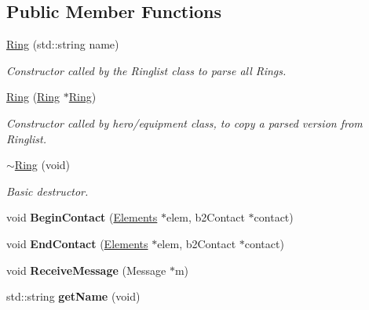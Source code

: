 \subsection*{Public Member Functions}
\begin{DoxyCompactItemize}
\item 
\hyperlink{class_ring_a7ab24e2216a4d5597cd116f7390a0764}{Ring} (std\+::string name)
\begin{DoxyCompactList}\small\item\em Constructor called by the Ringlist class to parse all Rings. \end{DoxyCompactList}\item 
\hyperlink{class_ring_a2e455981d4c351b79567a914de7bcf6b}{Ring} (\hyperlink{class_ring}{Ring} $\ast$\hyperlink{class_ring}{Ring})
\begin{DoxyCompactList}\small\item\em Constructor called by hero/equipment class, to copy a parsed version from Ringlist. \end{DoxyCompactList}\item 
\hypertarget{class_ring_a5772ea59f29433752c65bd5e74320819}{\hyperlink{class_ring_a5772ea59f29433752c65bd5e74320819}{$\sim$\+Ring} (void)}\label{class_ring_a5772ea59f29433752c65bd5e74320819}

\begin{DoxyCompactList}\small\item\em Basic destructor. \end{DoxyCompactList}\item 
\hypertarget{class_ring_ae68ccd08421cf4e2ad592030d39eb647}{void {\bfseries Begin\+Contact} (\hyperlink{class_elements}{Elements} $\ast$elem, b2\+Contact $\ast$contact)}\label{class_ring_ae68ccd08421cf4e2ad592030d39eb647}

\item 
\hypertarget{class_ring_aa11391dbb317b29549d91f0aa72463b7}{void {\bfseries End\+Contact} (\hyperlink{class_elements}{Elements} $\ast$elem, b2\+Contact $\ast$contact)}\label{class_ring_aa11391dbb317b29549d91f0aa72463b7}

\item 
\hypertarget{class_ring_a683679219761976f1ec86d69d804096a}{void {\bfseries Receive\+Message} (Message $\ast$m)}\label{class_ring_a683679219761976f1ec86d69d804096a}

\item 
\hypertarget{class_ring_aec2b4544713ee738c96a76c1f62aac11}{std\+::string {\bfseries get\+Name} (void)}\label{class_ring_aec2b4544713ee738c96a76c1f62aac11}


\end{DoxyCompactItemize}
